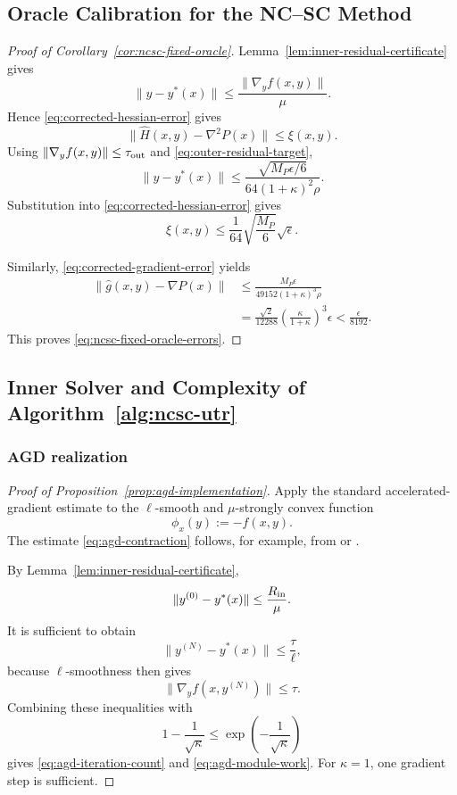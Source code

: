 \subsection{Oracle Calibration for the NC--SC Method}
\label{app:ncsc-oracle-calibration}

\begin{proof}[Proof of Corollary~\ref{cor:ncsc-fixed-oracle}]
Lemma~\ref{lem:inner-residual-certificate} gives
\[
    \|y-y^*(x)\|
    \le
    \frac{
        \|\nabla_yf(x,y)\|
    }{
        \mu
    }.
\]
Hence
\eqref{eq:corrected-hessian-error} gives
\[
    \|\widehat H(x,y)-\nabla^2P(x)\|
    \le
    \xi(x,y).
\]
Using
$\|\nabla_yf(x,y)\|\le\tau_{\rm out}$ and
\eqref{eq:outer-residual-target},
\[
    \|y-y^*(x)\|
    \le
    \frac{
        \sqrt{M_P\epsilon/6}
    }{
        64(1+\kappa)^2\rho
    }.
\]
Substitution into
\eqref{eq:corrected-hessian-error} gives
\[
    \xi(x,y)
    \le
    \frac1{64}
    \sqrt{\frac{M_P}{6}}\sqrt\epsilon.
\]

Similarly,
\eqref{eq:corrected-gradient-error} yields
\begin{align*}
    \|\widehat g(x,y)-\nabla P(x)\|
    &\le
    \frac{
        M_P\epsilon
    }{
        49152(1+\kappa)^3\rho
    }
    \\
    &=
    \frac{\sqrt2}{12288}
    \left(
        \frac{\kappa}{1+\kappa}
    \right)^3
    \epsilon
    <
    \frac{\epsilon}{8192}.
\end{align*}
This proves \eqref{eq:ncsc-fixed-oracle-errors}.
\end{proof}


\subsection{Inner Solver and Complexity of Algorithm~\ref{alg:ncsc-utr}}
\label{app:ncsc-complexity}


\subsubsection*{AGD realization}
\label{app:agd-realization}

\begin{proof}[Proof of Proposition~\ref{prop:agd-implementation}]
Apply the standard accelerated-gradient estimate to the
$\ell$-smooth and $\mu$-strongly convex function
\[
    \phi_x(y):=-f(x,y).
\]
The estimate
\eqref{eq:agd-contraction} follows, for example, from
\citet[Lemma~2]{wang2020improved} or
\citet[Lemma~5]{luo2022finding}.

By Lemma~\ref{lem:inner-residual-certificate},
\[
    \|y^{(0)}-y^*(x)\|
    \le
    \frac{R_{\rm in}}{\mu}.
\]
It is sufficient to obtain
\[
    \|y^{(N)}-y^*(x)\|
    \le
    \frac{\tau}{\ell},
\]
because $\ell$-smoothness then gives
\[
    \|\nabla_yf(x,y^{(N)})\|
    \le
    \tau.
\]
Combining these inequalities with
\[
    1-\frac1{\sqrt\kappa}
    \le
    \exp\!\left(-\frac1{\sqrt\kappa}\right)
\]
gives
\eqref{eq:agd-iteration-count} and
\eqref{eq:agd-module-work}.
For $\kappa=1$, one gradient step is sufficient.
\end{proof}


